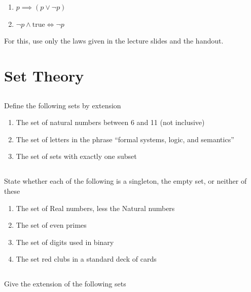 \documentclass[twocolumn]{article}
\begin{document}
\begin{enumerate}
    \item $p \implies (p \vee \neg p)$
    \item $\neg p \wedge \text{true} \Longleftrightarrow \neg p$
\end{enumerate}

For this, use only the laws given in the lecture slides and the handout.


\clearpage
\section{Set Theory}

\subsection{}

    Define the following sets by extension

    \begin{enumerate}
        \item The set of natural numbers between 6 and 11 (not inclusive)
        \item The set of letters in the phrase ``formal systems, logic, and semantics''
        \item The set of sets with exactly one subset
    \end{enumerate}

\subsection{}

    State whether each of the following is a singleton, the empty set, or neither of these

    \begin{enumerate}
        \item The set of Real numbers, less the Natural numbers
        \item The set of even primes
        \item The set of digits used in binary
        \item The set red clubs in a standard deck of cards
    \end{enumerate}

\subsection{}

    Give the extension of the following sets
\end{document}
